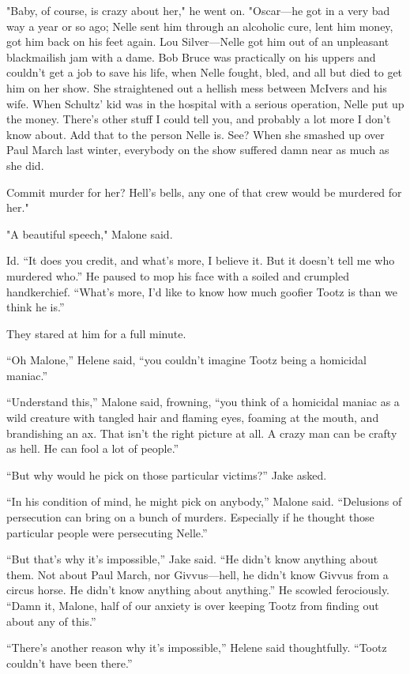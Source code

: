 \documentclass{novel}
\begin{document}
"Baby, of course, is crazy about her," he went on. "Oscar—he got in a very bad way a year or so ago; Nelle sent him through an alcoholic cure, lent him money, got him back on his feet again. Lou Silver—Nelle got him out of an unpleasant blackmailish jam with a dame. Bob Bruce was practically on his uppers and couldn't get a job to save his life, when Nelle fought, bled, and all but died to get him on her show. She straightened out a hellish mess between McIvers and his wife. When Schultz' kid was in the hospital with a serious operation, Nelle put up the money. There's other stuff I could tell you, and probably a lot more I don't know about. Add that to the person Nelle is. See? When she smashed up over Paul March last winter, everybody on the show suffered damn near as much as she did.

Commit murder for her? Hell's bells, any one of that crew would be murdered for her."

"A beautiful speech," Malone said.

Id. “It does you credit, and what’s more, I believe it. But it doesn’t tell me who murdered who.” He paused to mop his face with a soiled and crumpled handkerchief. “What’s more, I’d like to know how much goofier Tootz is than we think he is.”

They stared at him for a full minute.

“Oh Malone,” Helene said, “you couldn’t imagine Tootz being a homicidal maniac.”

“Understand this,” Malone said, frowning, “you think of a homicidal maniac as a wild creature with tangled hair and flaming eyes, foaming at the mouth, and brandishing an ax. That isn’t the right picture at all. A crazy man can be crafty as hell. He can fool a lot of people.”

“But why would he pick on those particular victims?” Jake asked.

“In his condition of mind, he might pick on anybody,” Malone said. “Delusions of persecution can bring on a bunch of murders. Especially if he thought those particular people were persecuting Nelle.”

“But that’s why it’s impossible,” Jake said. “He didn’t know anything about them. Not about Paul March, nor Givvus—hell, he didn’t know Givvus from a circus horse. He didn’t know anything about anything.” He scowled ferociously. “Damn it, Malone, half of our anxiety is over keeping Tootz from finding out about any of this.”

“There’s another reason why it’s impossible,” Helene said thoughtfully. “Tootz couldn’t have been there.”
\end{document}
